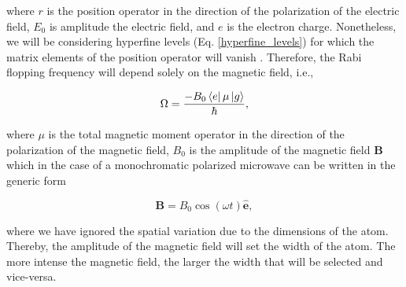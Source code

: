 \documentclass{article}
\begin{document}
where $r$ is the position operator in the direction of the polarization of the electric field, $E_{0}$ is amplitude the electric field, and $e$ is the electron charge. Nonetheless, we will be considering hyperfine levels (Eq. \ref{hyperfine_levels}) for which the matrix elements of the position operator will vanish  \cite{Steck2010}. Therefore, the Rabi flopping frequency will depend solely on the magnetic field, i.e.,

\begin{equation}\label{rabi_frequency_magnetic_field}
\Omega = \frac{- B_{0} \bra{e} \mu \ket{g}}{\hbar},
\end{equation}

where $\mu$ is the total magnetic moment operator in the direction of the polarization of the magnetic field, $B_{0}$ is the amplitude of the magnetic field $\textbf{B}$ which in the case of a monochromatic polarized microwave can be written in the generic form

\begin{equation}
    \textbf{B} =  B_{0} \cos(\omega t) \boldsymbol{\hat{e}},
\end{equation}

where we have ignored the spatial variation due to the dimensions of the atom. Thereby, the amplitude of the magnetic field will set the width of the atom. The more intense the magnetic field, the larger the width that will be selected and vice-versa.
\end{document}
